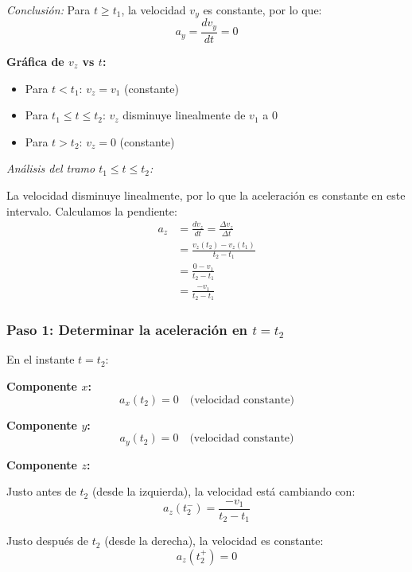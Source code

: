 \documentclass[12pt, a4paper]{article}
\begin{document}
\textit{Conclusión:} Para $t \geq t_1$, la velocidad $v_y$ es constante, por lo que:
\begin{equation}
a_y = \frac{dv_y}{dt} = 0
\end{equation}

\textbf{Gráfica de $v_z$ vs $t$:}
\begin{itemize}
    \item Para $t < t_1$: $v_z = v_1$ (constante)
    \item Para $t_1 \leq t \leq t_2$: $v_z$ disminuye linealmente de $v_1$ a $0$
    \item Para $t > t_2$: $v_z = 0$ (constante)
\end{itemize}

\textit{Análisis del tramo $t_1 \leq t \leq t_2$:} 

La velocidad disminuye linealmente, por lo que la aceleración es constante en este intervalo. Calculamos la pendiente:
\begin{align*}
a_z &= \frac{dv_z}{dt} = \frac{\Delta v_z}{\Delta t} \\
&= \frac{v_z(t_2) - v_z(t_1)}{t_2 - t_1} \\
&= \frac{0 - v_1}{t_2 - t_1} \\
&= \frac{-v_1}{t_2 - t_1}
\end{align*}

\subsubsection*{Paso 1: Determinar la aceleración en $t = t_2$}

En el instante $t = t_2$:

\textbf{Componente $x$:}
\begin{equation}
a_x(t_2) = 0 \quad \text{(velocidad constante)}
\end{equation}

\textbf{Componente $y$:}
\begin{equation}
a_y(t_2) = 0 \quad \text{(velocidad constante)}
\end{equation}

\textbf{Componente $z$:}

Justo antes de $t_2$ (desde la izquierda), la velocidad está cambiando con:
\begin{equation}
a_z(t_2^-) = \frac{-v_1}{t_2 - t_1}
\end{equation}

Justo después de $t_2$ (desde la derecha), la velocidad es constante:
\begin{equation}
a_z(t_2^+) = 0
\end{equation}
\end{document}
